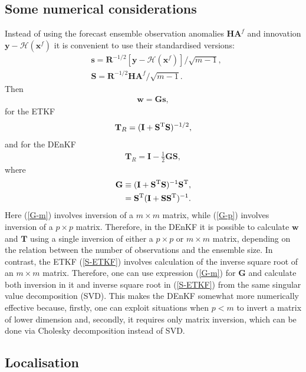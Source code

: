 \documentclass[11pt]{report}
\newcommand{\mb} {\mathbf}
\newcommand{\T}{^{\tiny \mathrm T}}
\begin{document}
\subsection{Some numerical considerations}
\label{sec:numerical}

Instead of using the forecast ensemble observation anomalies $\mb H \mb A^f$ and innovation $\mb y - \mathcal H(\mb x^f)$ it is convenient to use their standardised versions:
\begin{align}
  \label{s}
  &\mb s = \mb R^{-1/2} \left[ \mb y - \mathcal H(\mb x^f) \right] / \sqrt{m - 1},\\
  \label{S}
  &\mb S = \mb R^{-1/2} \mb H \mb A^f / \sqrt{m - 1}.
\end{align}
Then
\begin{align}
  \mb w = \mb G \mb s,
\end{align}
for the ETKF
\begin{align}
  \label{S-ETKF}
  \mb T_R = (\mb I + \mb S\T \mb S)^{-1/2},
\end{align}
and for the DEnKF
\begin{align}
  \label{S-DEnKF}
  \mb T_R = \mb I - \frac{1}{2} \mb G \mb S,
\end{align}
where
\begin{align}
  \label{G-m}
  \mb G &\equiv (\mb I + \mb S\T \mb S)^{-1} \mb S\T,\\
  \label{G-p}
  & = \mb S\T ( \mb I + \mb S \mb S\T)^{-1}.
\end{align}
Here (\ref{G-m}) involves inversion of a $m \times m$ matrix, while (\ref{G-p}) involves inversion of a $p \times p$ matrix.
Therefore, in the DEnKF it is possible to calculate $\mb w$ and $\mb T$ using a single inversion of either a $p \times p$ or $m \times m$ matrix, depending on the relation between the number of observations and the ensemble size.
In contrast, the ETKF (\ref{S-ETKF}) involves calculation of the inverse square root of an $m \times m$ matrix.
Therefore, one can use expression (\ref{G-m}) for $\mb G$ and calculate both inversion in it and inverse square root in (\ref{S-ETKF}) from the same singular value decomposition (SVD).
This makes the DEnKF somewhat more numerically effective because, firstly, one can exploit situations when $p < m$ to invert a matrix of lower dimension and, secondly, it requires only matrix inversion, which can be done via Cholesky decomposition instead of SVD.

\subsection{Localisation}
\end{document}
